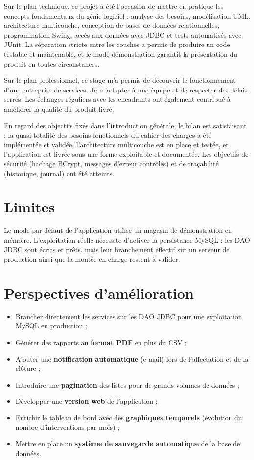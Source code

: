\documentclass[11pt,a4paper]{report}
\begin{document}
Sur le plan technique, ce projet a été l'occasion de mettre en pratique les concepts fondamentaux du génie logiciel : analyse des besoins, modélisation UML, architecture multicouche, conception de bases de données relationnelles, programmation Swing, accès aux données avec JDBC et tests automatisés avec JUnit. La séparation stricte entre les couches a permis de produire un code testable et maintenable, et le mode démonstration garantit la présentation du produit en toutes circonstances.

Sur le plan professionnel, ce stage m'a permis de découvrir le fonctionnement d'une entreprise de services, de m'adapter à une équipe et de respecter des délais serrés. Les échanges réguliers avec les encadrants ont également contribué à améliorer la qualité du produit livré.

En regard des objectifs fixés dans l'introduction générale, le bilan est satisfaisant : la quasi-totalité des besoins fonctionnels du cahier des charges a été implémentée et validée, l'architecture multicouche est en place et testée, et l'application est livrée sous une forme exploitable et documentée. Les objectifs de sécurité (hachage BCrypt, messages d'erreur contrôlés) et de traçabilité (historique, journal) ont été atteints.
\section*{Limites}

Le mode par défaut de l'application utilise un magasin de démonstration en mémoire. L'exploitation réelle nécessite d'activer la persistance MySQL : les DAO JDBC sont écrits et prêts, mais leur branchement effectif sur un serveur de production ainsi que la montée en charge restent à valider.
\section*{Perspectives d'amélioration}
\begin{itemize}
  \item Brancher directement les services sur les DAO JDBC pour une exploitation MySQL en production ;
  \item Générer des rapports au \textbf{format PDF} en plus du CSV ;
  \item Ajouter une \textbf{notification automatique} (e-mail) lors de l'affectation et de la clôture ;
  \item Introduire une \textbf{pagination} des listes pour de grands volumes de données ;
  \item Développer une \textbf{version web} de l'application ;
  \item Enrichir le tableau de bord avec des \textbf{graphiques temporels} (évolution du nombre d'interventions par mois) ;
  \item Mettre en place un \textbf{système de sauvegarde automatique} de la base de données.
\end{itemize}
\end{document}

